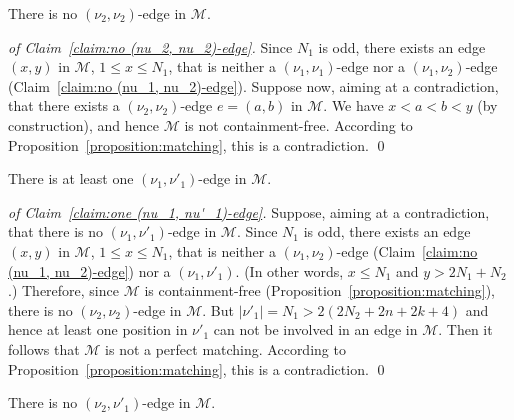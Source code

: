 \documentclass[a4paper,10pt]{llncs}
\begin{document}
\begin{claim}
  \label{claim:no (nu_2, nu_2)-edge}
  There is no $(\nu_2, \nu_2)$-edge in $\mathcal{M}$.
\end{claim}

\begin{proof}[of Claim~\ref{claim:no (nu_2, nu_2)-edge}]
Since $N_1$ is odd, there exists an edge $(x, y)$ in $\mathcal{M}$,
$1 \leq x \leq N_1$, that is neither a $(\nu_1, \nu_1)$-edge nor a
$(\nu_1, \nu_2)$-edge (Claim~\ref{claim:no (nu_1, nu_2)-edge}).
Suppose now, aiming at a contradiction,
that there exists a $(\nu_2, \nu_2)$-edge $e = (a, b)$ in $\mathcal{M}$.
We have $x < a < b < y$ (by construction), and hence $\mathcal{M}$ is not
containment-free.
According to Proposition~\ref{proposition:matching}, this is
a contradiction.
\qed
\end{proof}

\begin{claim}
  \label{claim:one (nu_1, nu'_1)-edge}
  There is at least one $(\nu_1, \nu'_1)$-edge in $\mathcal{M}$.
\end{claim}

\begin{proof}[of Claim~\ref{claim:one (nu_1, nu'_1)-edge}]
  Suppose, aiming at a contradiction, that there is no
  $(\nu_1, \nu'_1)$-edge in $\mathcal{M}$.
  Since $N_1$ is odd, there exists an edge $(x, y)$ in $\mathcal{M}$,
  $1 \leq x \leq N_1$, that is neither a
  $(\nu_1, \nu_2)$-edge (Claim~\ref{claim:no (nu_1, nu_2)-edge})
  nor a $(\nu_1, \nu'_1)$.
  (In other words, $x \leq N_1$ and $y > 2N_1 + N_2$.)
  Therefore, since $\mathcal{M}$ is containment-free (Proposition~\ref{proposition:matching}),
  there is no $(\nu_2, \nu_2)$-edge in $\mathcal{M}$.
  But $|\nu'_1| = N_1 > 2(2N_2 + 2n +2k +4)$ and hence at least one
  position in $\nu'_1$ can not be involved in an edge in $\mathcal{M}$.
  Then it follows that $\mathcal{M}$ is not a perfect matching.
  According to Proposition~\ref{proposition:matching}, this is
  a contradiction.
  \qed
\end{proof}

\begin{claim}
  \label{claim:no (nu_2, nu'_1)-edge}
  There is no $(\nu_2, \nu'_1)$-edge in $\mathcal{M}$.
\end{claim}
\end{document}
